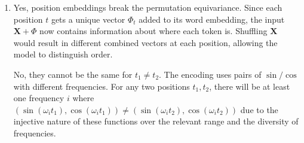 \begin{answer}
\begin{enumerate}[label=(\alph*)]
\begin{subparts}
            \subpart This property (permutation equivariance) means that the Transformer treats the input as a "bag of words" rather than a sequence. It has no inherent sense of word order. This is problematic for text because word order is crucial for meaning (e.g., "The dog bit the man" vs "The man bit the dog").
        \end{subparts}

        \item 
        \begin{subparts}
            \subpart Yes, position embeddings break the permutation equivariance. Since each position $t$ gets a unique vector $\Phi_t$ added to its word embedding, the input $\mathbf{X} + \Phi$ now contains information about where each token is. Shuffling $\mathbf{X}$ would result in different combined vectors at each position, allowing the model to distinguish order.
            
            \subpart No, they cannot be the same for $t_1 \neq t_2$. The encoding uses pairs of $\sin/\cos$ with different frequencies. For any two positions $t_1, t_2$, there will be at least one frequency $i$ where $(\sin(\omega_i t_1), \cos(\omega_i t_1)) \neq (\sin(\omega_i t_2), \cos(\omega_i t_2))$ due to the injective nature of these functions over the relevant range and the diversity of frequencies.
        \end{subparts}
    \end{enumerate}
\end{answer}
